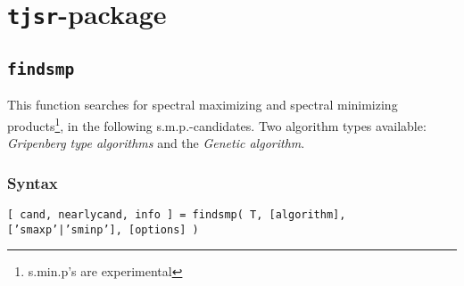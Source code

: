 

\chapter{\texttt{tjsr}-package}


\section{\texttt{findsmp}}\label{findsmp}
This function searches for 
spectral maximizing and spectral minimizing products\footnote{s.min.p's are experimental}, 
in the following s.m.p.-candidates.
Two algorithm types available: \emph{Gripenberg type algorithms} and the \emph{Genetic algorithm}.

\subsection*{Syntax}
\begin{param}
\item 
\texttt{[ cand, nearlycand, info ] = findsmp( T, [algorithm], ['smaxp'|'sminp'], [options] )}
\end{param}

